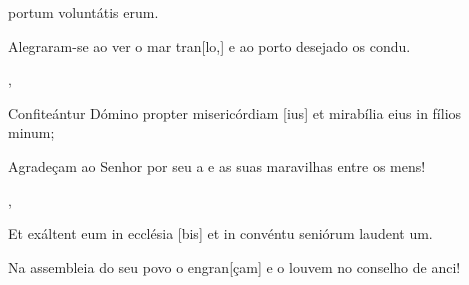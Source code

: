 {{      portum voluntátis erum.~\Responsorium}%
    {\item {}Alegraram-se ao ver o mar tran[lo,] e ao porto desejado os condu.~\Responsorium},
  {\item {}Confiteántur Dómino propter misericórdiam [\-ius] et mirabília eius in fílios minum;~\Responsorium}%
    {\item {}Agradeçam ao Senhor por seu a e as suas maravilhas entre os mens!~\Responsorium},
  {\item {}Et exáltent eum in ecclésia [bis] et in convéntu seniórum laudent um.~\Responsorium}%
    {\item {}Na assembleia do seu povo o engran[çam] e o louvem no conselho de anci!~\Responsorium}
}